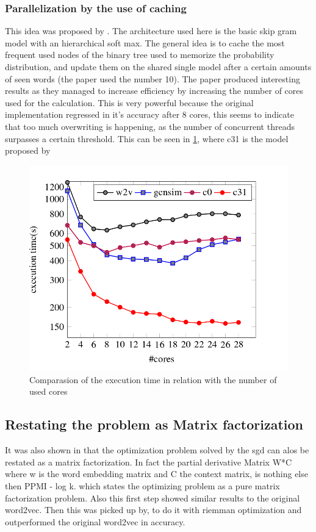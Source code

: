 \subsubsection{Parallelization by the use of caching}
This idea was proposed by \cite{efficient}. The architecture used here is the basic skip gram model with an hierarchical soft max.  The general idea is to cache the most frequent used nodes of the binary tree used to memorize the probability distribution, and update them on the shared single model after a certain amounts of seen words (the paper used the number 10). The paper produced interesting results as they managed to increase efficiency by increasing the number of cores used for the calculation. This is very powerful because the original implementation regressed in it's accuracy after 8 cores, this seems to indicate that too much overwriting is happening, as the number of concurrent threads surpasses a certain threshold. This can be seen in \ref{fig:efficient}, where c31 is the model proposed by \cite{efficient}
\begin{figure}[ht]
    \centering
			\includegraphics[scale=0.3]{images/cachingEfficiency.png} 
    \caption{Comparasion of the execution time in relation with the number of used cores \cite{efficient}}
    \label{fig:efficient}
\end{figure}

\subsection{Restating the problem as Matrix factorization}
It was also shown in \cite{goldenberger} that the optimization problem solved by the sgd can alos be restated as a matrix factorization. In fact the partial derivative Matrix W*C where w is the word embedding matrix and C the context matrix, is nothing else then PPMI - log k. which states the optimizing problem as a pure matrix factorization problem. Also this first step showed similar results to the original word2vec. Then this was picked up by, to do it with riemman  optimization and outperformed the original word2vec in accuracy. 

